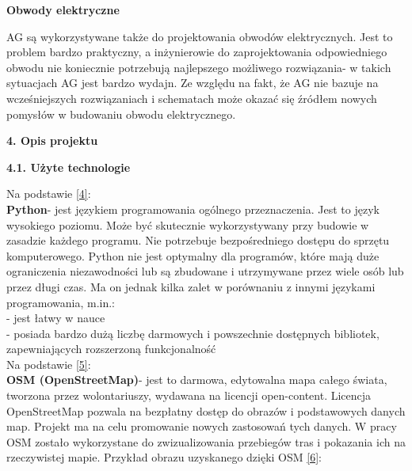 \documentclass[a4paper, twoside, 12pt, justified]{article}
\begin{document}
	
	\begin{center}
		\textbf{Obwody elektryczne}
	\end{center}

	AG są wykorzystywane także do projektowania obwodów elektrycznych. Jest to problem bardzo praktyczny, a inżynierowie do zaprojektowania odpowiedniego obwodu nie koniecznie potrzebują najlepszego możliwego rozwiązania- w takich sytuacjach AG jest bardzo wydajn. Ze względu na fakt, że AG nie bazuje na wcześniejszych rozwiązaniach i schematach może okazać się źródłem nowych pomysłów w budowaniu obwodu elektrycznego. 
	
	\newpage
	\begin{flushleft}
		\begin{large}
			\textbf{4. Opis projektu}
		\end{large}
	\end{flushleft}
	
	\vspace{5mm} %
	
	\begin{flushleft}
		\begin{large}
			\textbf{4.1. Użyte technologie}
		\end{large}
	\end{flushleft}
	\vspace{10mm} %
	
	 Na podstawie \hyperlink{python}{[4]}:\\
	 \textbf{Python}- jest językiem programowania ogólnego przeznaczenia. Jest to język wysokiego poziomu. Może być skutecznie wykorzystywany przy budowie w zasadzie każdego programu. Nie potrzebuje bezpośredniego dostępu do sprzętu komputerowego. Python nie jest optymalny dla programów, które mają duże ograniczenia niezawodności lub są zbudowane i utrzymywane przez wiele osób lub przez długi czas. Ma on jednak kilka zalet w porównaniu z innymi językami programowania, m.in.:\\
	 - jest łatwy w nauce\\ 
	 - posiada bardzo dużą liczbę darmowych i powszechnie dostępnych bibliotek, zapewniających rozszerzoną funkcjonalność\\ 
	 
	 Na podstawie \hyperlink{osm}{[5]}:\\
	 \textbf{OSM (OpenStreetMap)}- jest to darmowa, edytowalna mapa całego świata, tworzona przez wolontariuszy, wydawana na licencji open-content. Licencja OpenStreetMap pozwala na bezpłatny dostęp do obrazów i podstawowych danych map. Projekt ma na celu promowanie nowych zastosowań tych danych. W pracy OSM zostało wykorzystane do zwizualizowania przebiegów tras i pokazania ich na rzeczywistej mapie. Przykład obrazu uzyskanego dzięki OSM \hyperlink{osm_photo}{[6]}: \\
	 
\end{document}
